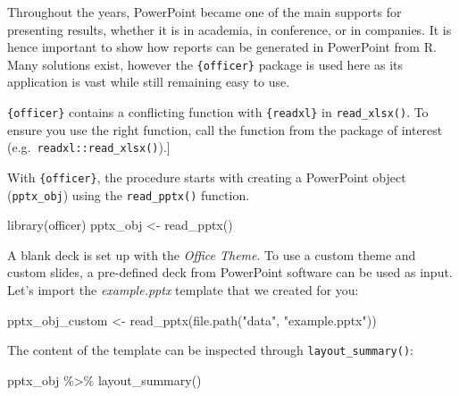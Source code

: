 \documentclass[
]{krantz}
\makeatletter
\newenvironment{Shaded}{\begin{snugshade}}{\end{snugshade}}
\newcommand{\FunctionTok}[1]{\textcolor[rgb]{0,0,0}{#1}}
\newcommand{\NormalTok}[1]{#1}
\newcommand{\OtherTok}[1]{\textcolor[rgb]{0.37,0.37,0.37}{#1}}
\newcommand{\SpecialCharTok}[1]{\textcolor[rgb]{0,0,0}{#1}}
\newcommand{\StringTok}[1]{\textcolor[rgb]{0.5,0.5,0.5}{#1}}
\renewenvironment{quote}{\begin{VF}}{\end{VF}}
\newenvironment{kframe}{%
\medskip{}
\setlength{\fboxsep}{.8em}
 \def\at@end@of@kframe{}%
 \ifinner\ifhmode%
  \def\at@end@of@kframe{\end{minipage}}%
  \begin{minipage}{\columnwidth}%
 \fi\fi%
 \def\FrameCommand##1{\hskip\@totalleftmargin \hskip-\fboxsep
 \colorbox{shadecolor}{##1}\hskip-\fboxsep
     \hskip-\linewidth \hskip-\@totalleftmargin \hskip\columnwidth}%
 \MakeFramed {\advance\hsize-\width
   \@totalleftmargin\z@ \linewidth\hsize
   \@setminipage}}%
 {\par\unskip\endMakeFramed%
 \at@end@of@kframe}
\renewenvironment{Shaded}{\begin{kframe}}{\end{kframe}}
\makeatother
\begin{document}
Throughout the years, PowerPoint became one of the main supports for presenting results, whether it is in academia, in conference, or in companies. It is hence important to show how reports can be generated in PowerPoint from R. Many solutions exist, however the \texttt{\{officer\}} package is used here as its application is vast while still remaining easy to use.

\begin{quote}
\texttt{\{officer\}} contains a conflicting function with \texttt{\{readxl\}} in \texttt{read\_xlsx()}. To ensure you use the right function, call the function from the package of interest (e.g.~\texttt{readxl::read\_xlsx()}).{]}
\end{quote}

With \texttt{\{officer\}}, the procedure starts with creating a PowerPoint object (\texttt{pptx\_obj}) using the \texttt{read\_pptx()} function.

\begin{Shaded}
\begin{Highlighting}[]
\FunctionTok{library}\NormalTok{(officer)}
\NormalTok{pptx\_obj }\OtherTok{\textless{}{-}} \FunctionTok{read\_pptx}\NormalTok{() }
\end{Highlighting}
\end{Shaded}

A blank deck is set up with the \emph{Office Theme}. To use a custom theme and custom slides, a pre-defined deck from PowerPoint software can be used as input. Let's import the \emph{example.pptx} template that we created for you:

\begin{Shaded}
\begin{Highlighting}[]
\NormalTok{pptx\_obj\_custom }\OtherTok{\textless{}{-}} \FunctionTok{read\_pptx}\NormalTok{(}\FunctionTok{file.path}\NormalTok{(}\StringTok{"data"}\NormalTok{, }\StringTok{"example.pptx"}\NormalTok{))}
\end{Highlighting}
\end{Shaded}

The content of the template can be inspected through \texttt{layout\_summary()}:

\begin{Shaded}
\begin{Highlighting}[]
\NormalTok{pptx\_obj }\SpecialCharTok{\%\textgreater{}\%}
  \FunctionTok{layout\_summary}\NormalTok{()}
\end{Highlighting}
\end{Shaded}
\end{document}

